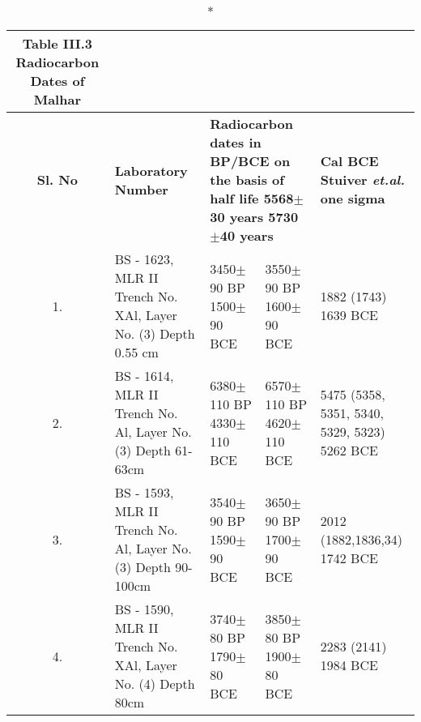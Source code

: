 {\setlength\tabcolsep{2pt}
{\fontsize{7}{9}\selectfont
\begin{longtable}{|c|p{3.2cm}|p{1.5cm}|p{1.5cm}|p{1.8cm}|}
\caption*{Table III.3 Radiocarbon Dates of Malhar}\label{table III.3}\\
\hline
\multicolumn{1}{|m{.5cm}|}{\centering \textbf{Sl. No}} &\multicolumn{1}{m{3.2cm}|}{\centering \textbf{Laboratory Number}}&\multicolumn{2}{m{3cm}|}{\centering \textbf{Radiocarbon dates in BP/BCE on the basis of half life 5568$\pm$30 years 5730$\pm$40 years}} &\multicolumn{1}{m{1.8cm}|}{\textbf{Cal BCE Stuiver {\it et.al.} one sigma}}\\
\hline
1. & BS - 1623, MLR II Trench No. XAl, Layer No. (3) Depth 0.55 cm & 3450$\pm$90 BP 1500$\pm$90 BCE & 3550$\pm$90 BP 1600$\pm$90 BCE & 1882 (1743) 1639 BCE\\
2. & BS - 1614, MLR II Trench No. Al, Layer No. (3) Depth 61-63cm & 6380$\pm$110 BP 4330$\pm$110 BCE & 6570$\pm$110 BP 4620$\pm$110 BCE & 5475 (5358, 5351, 5340, 5329, 5323) 5262 BCE\\
3. & BS - 1593, MLR II Trench No. Al, Layer No. (3) Depth 90-100cm &  3540$\pm$90 BP 1590$\pm$90 BCE & 3650$\pm$90 BP 1700$\pm$90 BCE & 2012 (1882,1836,34) 1742 BCE\\
4. & BS - 1590, MLR II Trench No. XAl, Layer No. (4) Depth 80cm & 3740$\pm$80 BP 1790$\pm$80 BCE & 3850$\pm$80 BP 1900$\pm$80 BCE & 2283 (2141) 1984 BCE\\
\hline
\end{longtable}
}}


